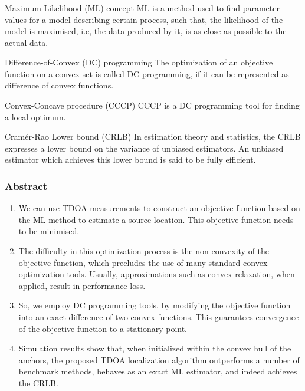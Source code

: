 \documentclass{beamer}
\begin{document}
\begin{frame}
\frametitle{}
\begin{block}{Maximum Likelihood (ML) concept}
ML is a method used to find parameter values for a model describing certain process, such that, the likelihood of the model is maximised, i.e, the data produced by it, is as close as possible to the actual data.
\end{block}
\begin{block}{Difference-of-Convex (DC) programming}
The optimization of an objective function on a convex set is called DC programming, if it can be represented as difference of convex functions.
\end{block}
\begin{block}{Convex-Concave procedure (CCCP)}
CCCP is a DC programming tool for finding a local optimum.
\end{block}
\begin{block}{Cramér-Rao Lower bound (CRLB)}
In estimation theory and statistics, the CRLB expresses a lower bound on the variance of unbiased estimators. An unbiased estimator which achieves this lower bound is said to be fully efficient.
\end{block}
\end{frame}

\begin{frame}
\frametitle{Abstract}
\begin{block}{}
\begin{enumerate}
    \item We can use TDOA measurements to construct an objective function based on the ML method to estimate a source location. This objective function needs to be minimised.
    \item The difficulty in this optimization process is the non-convexity of the objective function, which precludes the use of many standard convex optimization tools. Usually, approximations such as convex relaxation, when applied, result in performance loss.
    \item So, we employ DC programming tools, by modifying the objective function into an exact difference of two convex functions. This guarantees convergence of the objective function to a stationary point.
    \item Simulation results show that, when initialized within the convex hull of the anchors, the proposed TDOA localization algorithm outperforms a number of benchmark methods, behaves as an exact ML estimator, and indeed achieves the CRLB.
\end{enumerate}
\end{block}
\end{frame}
\end{document}

